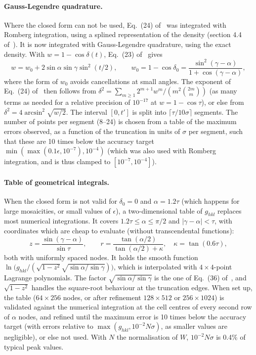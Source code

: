 \documentclass[11pt,a4paper]{article}
\newcommand{\Eq}[1]{Eq.~(#1) of~\cite{elastic}}
\begin{document}
\paragraph{Gauss-Legendre quadrature.} Where the closed form can not be used,
\Eq{24} was integrated with Romberg integration, using a splined
representation of the density (section 4.4 of~\cite{elastic}). It is now
integrated with Gauss-Legendre quadrature, using the exact density. With
$w = 1-\cos\delta(t)$, \Eq{23} gives
\begin{equation}
  w = w_0 + 2\sin\alpha\sin\gamma\sin^2(t/2), \qquad
  w_0 = 1-\cos\delta_0 = \frac{\sin^2(\gamma-\alpha)}{1+\cos(\gamma-\alpha)},
\end{equation}
where the form of $w_0$ avoids cancellations at small angles. The exponent
of \Eq{24} then follows from
$\delta^2 = \sum_{m\ge1} 2^{m+1}w^m/(m^2\binom{2m}{m})$ (as many terms as
needed for a relative precision of $10^{-17}$ at $w = 1-\cos\tau$), or else
from $\delta^2 = 4\arcsin^2\sqrt{w/2}$. The interval $[0,t']$ is split into
$\lceil\tau/10\sigma\rceil$ segments. The number of points per segment
(8--24) is chosen from a table of the maximum errors observed, as a function
of the truncation in units of $\sigma$ per segment, such that these are 10
times below the accuracy target $\min(\max(0.1\epsilon,10^{-7}),10^{-4})$
(which was also used with Romberg integration, and is thus clamped to
$[10^{-7},10^{-4}]$).

\paragraph{Table of geometrical integrals.} When the closed form is not
valid for $\delta_0 = 0$ and $\alpha = 1.2\tau$ (which happens for large
mosaicities, or small values of $\epsilon$), a two-dimensional table of $g_{hkl}$ replaces most
numerical integrations. It covers $1.2\tau \le \alpha \le \pi/2$ and
$|\gamma-\alpha| < \tau$, with coordinates which are cheap to evaluate
(without transcendental functions):
\begin{equation}
  z = \frac{\sin(\gamma-\alpha)}{\sin\tau}, \qquad
  r = \frac{\tan(\alpha/2)}{\tan(\alpha/2)+\kappa}, \quad \kappa = \tan(0.6\tau),
\end{equation}
both with uniformly spaced nodes. It holds the smooth function
$\ln\!\big(g_{hkl}/(\sqrt{1-z^2}\sqrt{\sin\alpha/\sin\gamma})\big)$, which is
interpolated with $4\times4$-point Lagrange polynomials. The factor
$\sqrt{\sin\alpha/\sin\gamma}$ is the one of \Eq{36}, and $\sqrt{1-z^2}$
handles the square-root behaviour at the truncation edges. When set up, the
table ($64\times256$ nodes, or after refinement $128\times512$ or
$256\times1024$) is validated against the numerical integration at the cell
centres of every second row of $\alpha$ nodes, and refined until the maximum
error is 10 times below the accuracy target (with errors relative to
$\max(g_{hkl},10^{-2}N\sigma)$, as smaller values are negligible), or else
not used. With $N$ the normalisation of $W$, $10^{-2}N\sigma$ is 0.4\% of
typical peak values.
\end{document}

